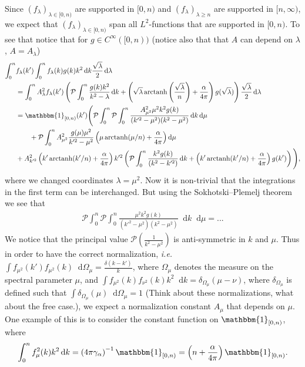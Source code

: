 \documentclass[a4paper,11pt]{article}
\DeclareMathOperator\arctanh{arctanh}
\newcommand*\diff{\mathop{}\!\mathrm{d}}
\newcommand{\ie}{\emph{i.e.} }
\numberwithin{equation}{section}
\begin{document}
	Since $ (f_\lambda)_{\lambda\in[0,n)} $ are supported in $ [0,n) $ and $ (f_\lambda)_{\lambda\geq n} $ are supported in $ [n,\infty) $, we expect that $ (f_\lambda)_{\lambda\in[0,n)}  $ span all $ L^2 $-functions that are supported in $ [0,n) $. To see that notice that for $ g\in C^\infty([0,n)) $ (notice also that that $ A $ can depend on $ \lambda $, $ A=A_\lambda $) \begin{equation}
	\begin{aligned}
	\int_{0}^{n}& f_\lambda(k')\int_{0}^{n}f_\lambda(k)g(k) k^2 \diff k\frac{\sqrt{\lambda}}{2} \diff\lambda\\&
	=\int_{0}^{n}A_\lambda^2 f_\lambda(k')\left(\mathcal{P}\int_{0}^{n}\frac{g(k)k^2}{k^2-\lambda}\diff k+\left(\sqrt{\lambda}\arctanh\left(\frac{\sqrt{\lambda}}{n}\right)+\frac{\alpha}{4\pi}\right)g(\sqrt{\lambda})\right)\frac{\sqrt{\lambda}}{2} \diff \lambda\\
	&=\mathbbm{1}_{[0,n)}(k')\Bigg(\mathcal{P}\int_{0}^{n}\mathcal{P}\int_{0}^{n}\frac{A_{\mu^2}^2\mu^2 k^2g(k)}{(k'^2-\mu^2)(k^2-\mu^2)}\diff k\diff \mu\\&\qquad+\mathcal{P}\int_{0}^{n}A_{\mu^2}^2\frac{g(\mu)\mu^2}{k'^2-\mu^2}\left(\mu\arctanh(\mu/n)+\frac{\alpha}{4\pi}\right)\diff\mu\\
	&+A_{k'^2}^2\left(k'\arctanh(k'/n)+\frac{\alpha}{4\pi }\right)k'^2\left(\mathcal{P}\int_{0}^{n}\frac{k^2g(k)}{(k^2-k'^2)}\diff k+\left(k'\arctanh(k'/n)+\frac{\alpha}{4\pi}\right)g(k')\right)\Bigg),\\
	\end{aligned}
	\end{equation}
	where we changed coordinates $ \lambda=\mu^2 $.
	Now it is non-trivial that the integrations in the first term can be interchanged. But using the Sokhotski–Plemelj theorem we see that \begin{equation}
	\begin{aligned}
	\mathcal{P}\int_{0}^{n}\mathcal{P}\int_{0}^{n}\frac{\mu^2 k^2g(k)}{(k'^2-\mu^2)(k^2-\mu^2)}\diff k\diff \mu=...
	\end{aligned}
	\end{equation}
	We notice that the principal value $ \mathcal{P}(\frac{1}{k^2-\mu^2}) $ is anti-symmetric in $ k $ and $ \mu $. Thus in order to have the correct normalization, \ie $ \int f_{\mu^2}(k')f_{\mu^2}(k)\diff \Omega_\mu=\frac{\delta(k-k')}{k} $, where $ \Omega_\mu $ denotes the measure on the spectral parameter $ \mu $, and $ \int f_{\mu^2}(k)f_{\nu^2}(k)k^2\diff k=\delta_{\Omega_\mu}(\mu-\nu) $, where $ \delta_{\Omega_\mu} $ is defined such that $ \int\delta_{\Omega_\mu}(\mu)\diff \Omega_\mu=1  $ (Think about these normalizations, what about the free case.), we expect a normalization constant $ A_\mu $ that depends on $ \mu $. One example of this is to consider the constant function on $ \mathbbm{1}_{[0,n)} $, where \begin{equation}
	\int_{0}^{n}f_\mu^2(k) k^2\diff k=\left(4\pi\gamma_\alpha\right)^{-1}\mathbbm{1}_{[0,n)}=\left(n+\frac{\alpha}{4\pi}\right)\mathbbm{1}_{[0,n)}.
	\end{equation}
\end{document}
